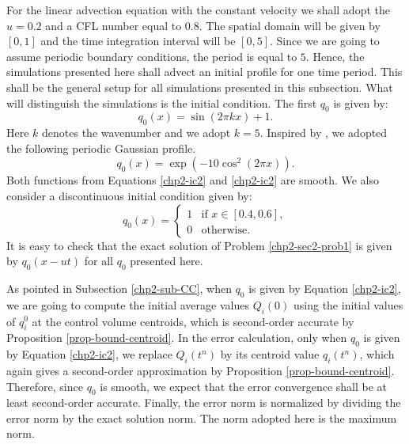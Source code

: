 For the linear advection equation with the constant velocity we shall adopt the $u=0.2$ and 
a CFL number equal to $0.8$.
The spatial domain will be given by $[0,1]$ and the time integration interval will be $[0,5]$.
Since we are going to assume periodic boundary conditions, the period is equal to $5$. 
Hence, the simulations presented here shall advect an initial profile for one time period. 
This shall be the general setup for all simulations presented in this subsection. 
What will distinguish the simulations is the initial condition.
The first $q_0$ is given by:
\begin{equation}
	\label{chp2-ic1}
	q_0(x) = \sin (2\pi k x) + 1.
\end{equation}
Here $k$ denotes the wavenumber and we adopt $k=5$.
Inspired by \citet{trefethen:2000}, we adopted the following periodic Gaussian profile.
\begin{equation}
	\label{chp2-ic2}
		q_0(x) = \exp(-10\cos^2 (2\pi x)).
\end{equation}
Both functions from Equations \eqref{chp2-ic2} and \eqref{chp2-ic2} are smooth.
We also consider a discontinuous initial condition given by:
\begin{equation}
	\label{chp2-ic3}
		q_0(x) =  
  \begin{cases}
		1 & \text{if } x \in [0.4,0.6],\\
		0 & \text{otherwise}.
  \end{cases}
\end{equation}
It is easy to check that the  exact solution of Problem \ref{chp2-sec2-prob1}
is given by $q_0(x-ut)$ for all $q_0$ presented here.

As pointed in Subsection \ref{chp2-sub-CC}, when $q_0$ is given by Equation \eqref{chp2-ic2},
we are going to compute the initial average values $Q_i(0)$ using
the initial values of $q^0_i$ at the control volume centroids, which is second-order 
accurate by Proposition \ref{prop-bound-centroid}.
In the error calculation, only when $q_0$ is given by Equation \eqref{chp2-ic2},
we replace $Q_{i}(t^n)$ by its centroid value $q_{i}(t^n)$, which again gives
a second-order approximation by Proposition \ref{prop-bound-centroid}.
Therefore, since $q_0$ is smooth, we expect that the error convergence shall be at least second-order accurate.
Finally, the error norm is normalized by dividing the error norm by the exact solution norm. 
The norm adopted here is the maximum norm.

